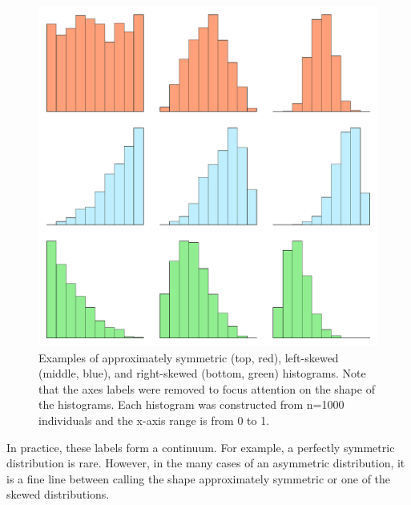 \documentclass[10pt,openany]{book}\usepackage[]{graphicx}\usepackage[]{color}
\newenvironment{knitrout}{}{} %
\begin{document}
\begin{knitrout}
\color{fgcolor}\begin{figure}[hbtp]

{\centering \includegraphics[width=.7\linewidth]{Figs/ShapeExamples-1} 

}

\caption[Examples of approximately symmetric (top, red), left-skewed (middle, blue), and right-skewed (bottom, green) histograms]{Examples of approximately symmetric (top, red), left-skewed (middle, blue), and right-skewed (bottom, green) histograms.  Note that the axes labels were removed to focus attention on the shape of the histograms.  Each histogram was constructed from n=1000 individuals and the x-axis range is from 0 to 1.}\label{fig:ShapeExamples}
\end{figure}


\end{knitrout}


\vspace{-12pt}

\vspace{-12pt}

\vspace{-12pt}

In practice, these labels form a continuum.  For example, a perfectly symmetric distribution is rare.  However, in the many cases of an asymmetric distribution, it is a fine line between calling the shape approximately symmetric or one of the skewed distributions.
\end{document}
